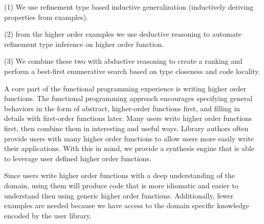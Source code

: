 (1) We use refinement type based inductive generalization (inductively deriving properties from examples).

(2) from the higher order examples we use deductive reasoning to automate refinement type inference on higher order function.

(3) We combine these two with abductive reasoning to create a ranking and perform a best-first enumerative search based on type closeness and code locality. 

A core part of the functional programming experience is writing higher order functions. The functional programming approach encourages specifying general behaviors in the form of abstract, higher-order functions first, and filling in details with first-order functions later. Many users write higher order functions first, then combine them in interesting and useful ways. Library authors often provide users with many higher order functions to allow users more easily write their applications. With this in mind, we provide a synthesis engine that is able to leverage user defined higher order functions.

Since users write higher order functions with a deep understanding of the domain, using them will produce code that is more idiomatic and easier to understand then using generic higher order functions. Additionally, fewer examples are needed because we have access to the domain specific knowledge encoded by the user library.